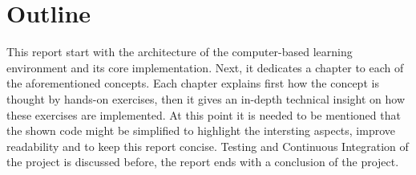 \section{Outline}

This report start with the architecture of the computer-based learning environment and its core implementation. Next, it dedicates a chapter to each of the aforementioned concepts. Each chapter explains first how the concept is thought by hands-on exercises, then it gives an in-depth technical insight on how these exercises are implemented. At this point it is needed to be mentioned that the shown code might be simplified to highlight the intersting aspects, improve readability and to keep this report concise. Testing and Continuous Integration of the project is discussed before, the report ends with a conclusion of the project.
